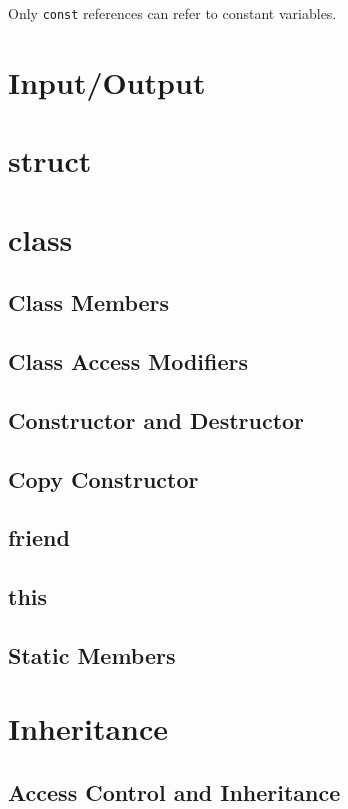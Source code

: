 \documentclass[10pt,a4paper]{scrartcl}
\begin{document}
\begin{multicols*}{2}
Only \verb+const+ references can refer to constant variables.
\section{Input/Output}

\section{struct}

\section{class}

\subsection{Class Members}

\subsection{Class Access Modifiers}

\subsection{Constructor and Destructor}

\subsection{Copy Constructor}

\subsection{friend}

\subsection{this}

\subsection{Static Members}

\section{Inheritance}

\subsection{Access Control and Inheritance}


\end{multicols*}
\end{document}
